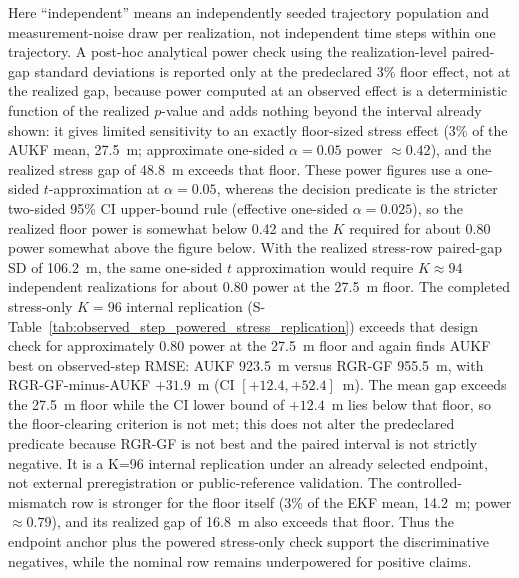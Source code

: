 \documentclass{article}
\begin{document}
Here ``independent'' means an independently seeded trajectory population and measurement-noise draw per realization, not independent time steps within one trajectory. A post-hoc analytical power check using the realization-level paired-gap standard deviations is reported only at the predeclared 3\% floor effect, not at the realized gap, because power computed at an observed effect is a deterministic function of the realized $p$-value and adds nothing beyond the interval already shown: it gives limited sensitivity to an exactly floor-sized stress effect (3\% of the AUKF mean, 27.5~m; approximate one-sided $\alpha=0.05$ power $\approx 0.42$), and the realized stress gap of 48.8~m exceeds that floor. These power figures use a one-sided $t$-approximation at $\alpha=0.05$, whereas the decision predicate is the stricter two-sided 95\% CI upper-bound rule (effective one-sided $\alpha=0.025$), so the realized floor power is somewhat below 0.42 and the $K$ required for about 0.80 power somewhat above the figure below. With the realized stress-row paired-gap SD of 106.2~m, the same one-sided $t$ approximation would require $K\approx94$ independent realizations for about 0.80 power at the 27.5~m floor. The completed stress-only $K=96$ internal replication (S-Table~\ref{tab:observed_step_powered_stress_replication}) exceeds that design check for approximately 0.80 power at the 27.5~m floor and again finds AUKF best on observed-step RMSE: AUKF 923.5~m versus RGR-GF 955.5~m, with RGR-GF-minus-AUKF \(+31.9\)~m (CI \([+12.4,+52.4]\)~m). The mean gap exceeds the 27.5~m floor while the CI lower bound of $+12.4$~m lies below that floor, so the floor-clearing criterion is not met; this does not alter the predeclared predicate because RGR-GF is not best and the paired interval is not strictly negative. It is a K=96 internal replication under an already selected endpoint, not external preregistration or public-reference validation. The controlled-mismatch row is stronger for the floor itself (3\% of the EKF mean, 14.2~m; power $\approx 0.79$), and its realized gap of 16.8~m also exceeds that floor. Thus the endpoint anchor plus the powered stress-only check support the discriminative negatives, while the nominal row remains underpowered for positive claims.
\end{document}
